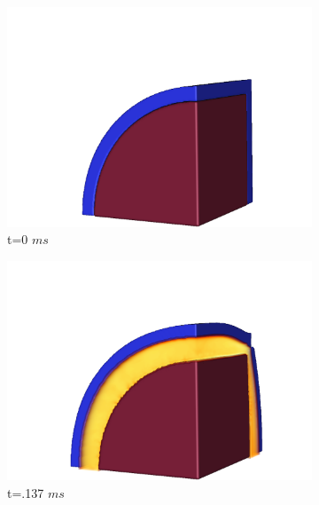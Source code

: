 \begin{figure}[t!]
 \centering
 \begin{subfigure}[b]{0.3\textwidth}
   \includegraphics[width=\textwidth]{Figs/mpmice/NE_0_d.png}
   \caption{t=0 $ms$}
   \label{figCookoff:a}
 \end{subfigure}
 \begin{subfigure}[b]{0.3\textwidth}
   \includegraphics[width=\textwidth]{Figs/mpmice/NE_46_c.png}
   \caption{t=.137 $ms$}
   \label{figCookoff:b}
 \end{subfigure}
 \begin{subfigure}[b]{0.3\textwidth}

\end{subfigure}
\end{figure}

